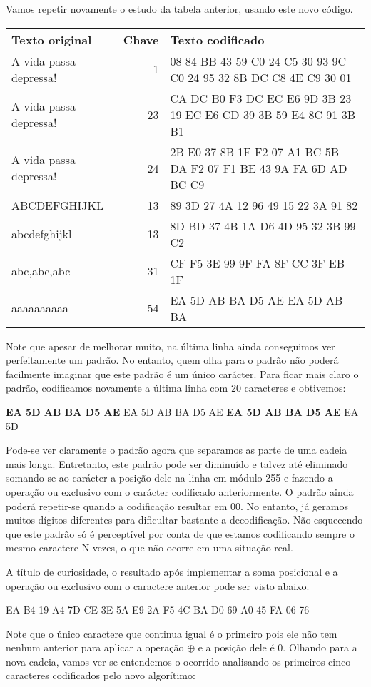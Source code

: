 Vamos repetir novamente o estudo da tabela anterior, usando este novo código.

\begin{tabular}{|l|r|p{8cm}|}
\hline
Texto original&Chave&Texto codificado\\
\hline
A vida passa depressa!&1&08 84 BB 43 59 C0 24 C5 30 93 9C C0 24 95 32 8B DC C8 4E C9 30 01\\
\hline
A vida passa depressa!&23&CA DC B0 F3 DC EC E6 9D 3B 23 19 EC E6 CD 39 3B 59 E4 8C 91 3B B1\\
\hline
A vida passa depressa!&24&2B E0 37 8B 1F F2 07 A1 BC 5B DA F2 07 F1 BE 43 9A FA 6D AD BC C9\\
\hline
ABCDEFGHIJKL&13&89 3D 27 4A 12 96 49 15 22 3A 91 82\\
\hline
abcdefghijkl&13&8D BD 37 4B 1A D6 4D 95 32 3B 99 C2\\
\hline
abc,abc,abc&31&CF F5 3E 99 9F FA 8F CC 3F EB 1F\\
\hline
aaaaaaaaaa&54&EA 5D AB BA D5 AE EA 5D AB BA\\
\hline
\end{tabular}

Note que apesar de melhorar muito, na última linha ainda conseguimos ver perfeitamente um padrão. No entanto, quem olha para o padrão não poderá facilmente imaginar que este padrão é um único carácter. Para ficar mais claro o padrão, codificamos novamente a última linha com 20 caracteres e obtivemos:
\begin{center}
\textbf{EA 5D AB BA D5 AE} EA 5D AB BA D5 AE \textbf{EA 5D AB BA D5 AE} EA 5D\\
\end{center}

Pode-se ver claramente o padrão agora que separamos as parte de uma cadeia mais longa. Entretanto, este padrão pode ser diminuído e talvez até eliminado somando-se ao carácter a posição dele na linha em módulo 255 e fazendo a operação ou exclusivo com o carácter codificado anteriormente. O padrão ainda poderá repetir-se quando a codificação resultar em 00. No entanto, já geramos muitos dígitos diferentes para dificultar bastante a decodificação. Não esquecendo que este  padrão só é perceptível por conta de que estamos codificando sempre o mesmo caractere N vezes, o que não ocorre em uma situação real.

A título de curiosidade, o resultado após implementar a soma posicional e a operação ou exclusivo com o caractere anterior pode ser visto abaixo.
\begin{center}
EA B4 19 A4 7D CE 3E 5A E9 2A F5 4C BA D0 69 A0 45 FA 06 76
\end{center}
Note que o único caractere que continua igual é o primeiro pois ele não tem nenhum anterior para aplicar a operação $ \oplus $ e a posição dele é 0. Olhando para a nova cadeia, vamos ver se entendemos o ocorrido analisando os primeiros cinco caracteres codificados pelo novo algorítimo:

